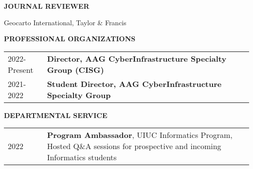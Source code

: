 \documentclass{acmcv}
\begin{document}
    \textbf{\uppercase{Journal Reviewer}}
    \begin{titemize}
        \item Geocarto International, Taylor \& Francis
    \end{titemize}
    \vspace*{.25cm}

    \textbf{\uppercase{Professional Organizations}}
    \begin{longtable}{p{0.16\linewidth} p{0.84\linewidth}}

        2022-Present & \textbf{Director, AAG CyberInfrastructure Specialty Group (CISG)} \\

        2021-2022 & \textbf{Student Director, AAG CyberInfrastructure Specialty Group}
    \end{longtable}

    \textbf{\uppercase{Departmental Service}}
    \begin{longtable}{p{0.16\linewidth} p{0.84\linewidth}}
        2022 & \textbf{Program Ambassador}, UIUC Informatics Program, Hosted Q\&A sessions for prospective and incoming Informatics students \\
    \end{longtable}

	
		
		
		
\end{document}
